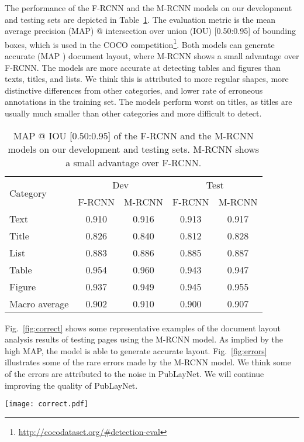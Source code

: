 \documentclass[conference]{IEEEtran}
\begin{document}
The performance of the F-RCNN and the M-RCNN models on our development and testing sets are depicted in Table~\ref{tab:eval}. The evaluation metric is the mean average precision (MAP) @ intersection over union (IOU) [0.50:0.95] of bounding boxes, which is used in the COCO competition\footnote{\url{http://cocodataset.org/#detection-eval}}. Both models can generate accurate (MAP ) document layout, where M-RCNN shows a small advantage over F-RCNN. The models are more accurate at detecting tables and figures than texts, titles, and lists. We think this is attributed to more regular shapes, more distinctive differences from other categories, and lower rate of erroneous annotations in the training set. The models perform worst on titles, as titles are usually much smaller than other categories and more difficult to detect.
\begin{table}[!htb]
  \caption{MAP @ IOU [0.50:0.95] of the F-RCNN and the M-RCNN models on our development and testing sets. M-RCNN shows a small advantage over F-RCNN.}
  \label{tab:eval}
  \centering
  \begin{tabular}{lcccc}
    \toprule
    \multirow{2}{*}{Category} & \multicolumn{2}{c}{Dev} & \multicolumn{2}{c}{Test} \\
    & F-RCNN & M-RCNN & F-RCNN & M-RCNN \\
    \midrule
    Text & 0.910 & 0.916 & 0.913 & 0.917 \\
    Title & 0.826 & 0.840 & 0.812 & 0.828 \\
    List & 0.883 & 0.886 & 0.885 & 0.887 \\
    Table & 0.954 & 0.960 & 0.943 & 0.947 \\
    Figure & 0.937 & 0.949 & 0.945 & 0.955 \\
    \midrule
    Macro average & 0.902 & 0.910 & 0.900 & 0.907 \\
    \bottomrule
\end{tabular}
\end{table}

Fig.~\ref{fig:correct} shows some representative examples of the document layout analysis results of testing pages using the M-RCNN model. As implied by the high MAP, the model is able to generate accurate layout. Fig.~\ref{fig:errors} illustrates some of the rare errors made by the M-RCNN model. We think some of the errors are attributed to the noise in PubLayNet. We will continue improving the quality of PubLayNet.

\begin{figure*}[!htb]
  \centering
  \texttt{[image: correct.pdf]}
  \caption{Representative examples of the document layout analysis results using the M-RCNN model. As implied by the high MAP, the model is able to generate accurate layout.}
  \label{fig:correct}
\end{figure*}
\end{document}
